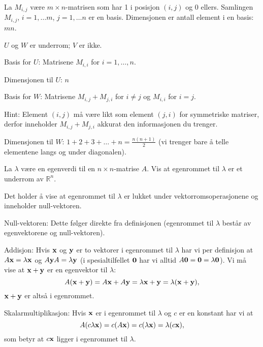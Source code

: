 \begin{losning}
\begin{punkt}
La $M_{i,j}$ være $m\times n$-matrisen som har 1 i posisjon $(i,j)$ og 0 ellers. Samlingen $M_{i,j}$, $i=1,\dots m$, $j=1,\dots n$ er en basis. Dimensjonen er antall element i en basis: $mn$.
\end{punkt}

\begin{punkt}
$U$ og $W$ er underrom; $V$ er ikke.
\end{punkt}

\begin{punkt}
\noindent
Basis for $U$: Matrisene $M_{i,i}$ for $i=1,\dots,n$.

\noindent
Dimensjonen til $U$: $n$

\noindent
Basis for $W$: Matrisene $M_{i,j}+M_{j,i}$ for $i\neq j$ og $M_{i,i}$ for $i=j$.

\noindent
Hint: Element $(i,j)$ må være likt som element $(j,i)$ for symmetriske matriser, derfor inneholder $M_{i,j}+M_{j,i}$ akkurat den informasjonen du trenger.


\noindent 
Dimensjonen til $W$: $1+2+3+\dots +n=\frac{n(n+1)}{2}$ (vi trenger bare å telle elementene langs og under diagonalen).
\end{punkt}


\end{losning}


\begin{oppgave}
La $\lambda$ være en egenverdi til en $n\times n$-matrise $A$. Vis at egenrommet til $\lambda$ er et underrom av $\mathbb{R}^n$.
\end{oppgave}

\begin{losning}
Det holder å vise at egenrommet til $\lambda$ er lukket under vektorromsoperasjonene og inneholder null-vektoren.

\noindent
Null-vektoren: Dette følger direkte fra definisjonen (egenrommet til $\lambda$ består av egenvektorene og null-vektoren).


\noindent
Addisjon: Hvis $\mathbf{x}$ og $\mathbf{y}$ er to vektorer i egenrommet til $\lambda$ har vi per definisjon at $A\mathbf{x}=\lambda \mathbf{x}$ og $A\mathbf{y}A=\lambda \mathbf{y}$ (i spesialtilfellet $\mathbf{0}$ har vi alltid $A\mathbf{0}=\mathbf{0}=\lambda \mathbf{0}$). Vi må vise at $\mathbf{x}+\mathbf{y}$ er en egenvektor til $\lambda$: $$A(\mathbf{x}+\mathbf{y})=A\mathbf{x}+A\mathbf{y}=\lambda \mathbf{x}+ \mathbf{y}=\lambda(\mathbf{x}+\mathbf{y}),$$ $\mathbf{x}+\mathbf{y}$ er altså i egenrommet.

\noindent
Skalarmultiplikasjon: Hvis $\mathbf{x}$ er i egenrommet til $\lambda$ og $c$ er en konstant har vi at $$A(c\lambda\mathbf{x})=c(A \mathbf{x})=c(\lambda \mathbf{x})=\lambda(c \mathbf{x}),$$ som betyr at $c\mathbf{x}$ ligger i egenrommet til $\lambda$.
\end{losning}


